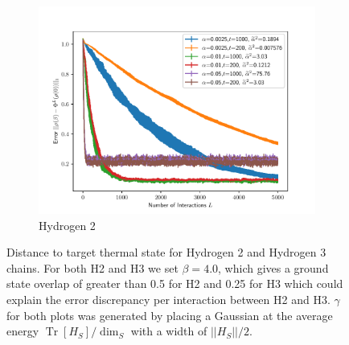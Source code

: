 \documentclass{article}
\newcommand{\brackets}[1]{\left[ #1 \right]}
\newcommand{\norm}[1]{\left|\left| #1 \right|\right|}
\DeclareMathOperator{\Tr}{Tr}
\newcommand{\trace}[1]{\Tr \brackets{ #1 }}
\begin{document}
\begin{figure}
\centering
    \centering
    \begin{subfigure}{0.49\textwidth}
        \includegraphics[width = \textwidth]{numerics/data/error_vs_interaction_h2_chain_1.pdf}    
        \caption{Hydrogen 2 }
    \end{subfigure}    
    \caption{Distance to target thermal state for Hydrogen 2 and Hydrogen 3 chains. For both H2 and H3 we set $\beta = 4.0$, which gives a ground state overlap of greater than 0.5 for H2 and 0.25 for H3 which could explain the error discrepancy per interaction between H2 and H3. $\gamma$ for both plots was generated by placing a Gaussian at the average energy $\trace{H_S} / \dim_S$ with a width of $\norm{H_S} / 2$. }
    \label{fig:h_chain_error}
\end{figure}
\end{document}
